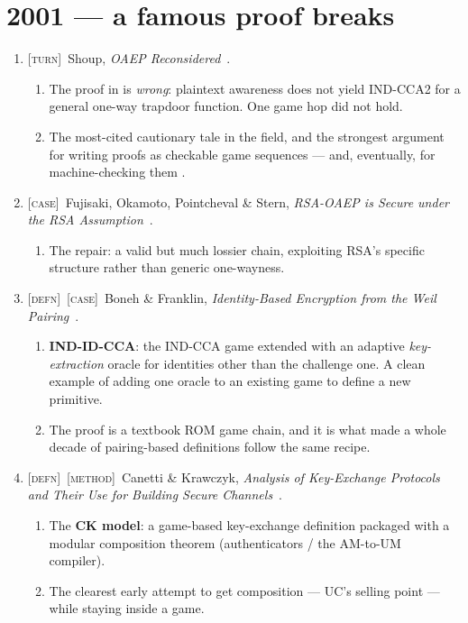 \documentclass[11pt]{article}
\newcommand{\kind}[1]{{\footnotesize\textsc{\textcolor{yearcolor}{[#1]}}}\ }
\newcommand{\defn}{\kind{defn}}
\newcommand{\method}{\kind{method}}
\newcommand{\turn}{\kind{turn}}
\newcommand{\case}{\kind{case}}
\newcommand{\paper}[3]{#1, \emph{#2}~\cite{#3}.}
\begin{document}
\section{2001 --- a famous proof breaks}

\begin{enumerate}
  \item \turn \paper{Shoup}{OAEP Reconsidered}{Shou01}
    \begin{enumerate}
      \item The proof in \cite{BR94} is \emph{wrong}: plaintext awareness does
        not yield IND-CCA2 for a general one-way trapdoor function. One game hop
        did not hold.
      \item The most-cited cautionary tale in the field, and the strongest
        argument for writing proofs as checkable game sequences --- and,
        eventually, for machine-checking them \cite{CertiCrypt09}.
    \end{enumerate}

  \item \case \paper{Fujisaki, Okamoto, Pointcheval \& Stern}{RSA-OAEP is Secure
    under the RSA Assumption}{FOPS04}
    \begin{enumerate}
      \item The repair: a valid but much lossier chain, exploiting RSA's
        specific structure rather than generic one-wayness.
    \end{enumerate}

  \item \defn\case \paper{Boneh \& Franklin}{Identity-Based Encryption from the
    Weil Pairing}{BF03}
    \begin{enumerate}
      \item \textbf{IND-ID-CCA}: the IND-CCA game extended with an adaptive
        \emph{key-extraction} oracle for identities other than the challenge
        one. A clean example of adding one oracle to an existing game to define
        a new primitive.
      \item The proof is a textbook ROM game chain, and it is what made a whole
        decade of pairing-based definitions follow the same recipe.
    \end{enumerate}

  \item \defn\method \paper{Canetti \& Krawczyk}{Analysis of Key-Exchange
    Protocols and Their Use for Building Secure Channels}{CK01}
    \begin{enumerate}
      \item The \textbf{CK model}: a game-based key-exchange definition
        packaged with a modular composition theorem (authenticators / the
        AM-to-UM compiler).
      \item The clearest early attempt to get composition --- UC's selling
        point --- while staying inside a game.
    \end{enumerate}


\end{enumerate}
\end{document}
